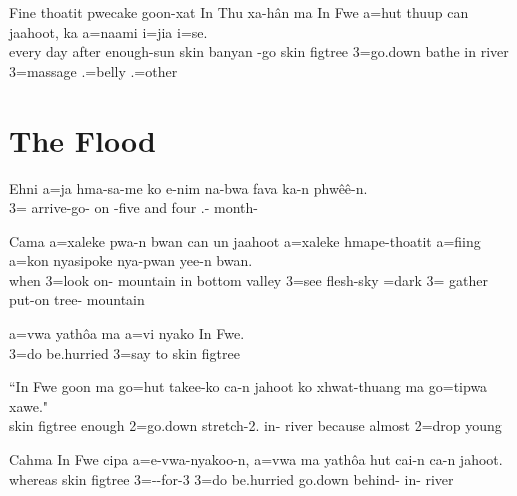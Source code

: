 \ea
\gll Fine thoatit pwecake goon-xat In Thu xa-hân ma In Fwe a=hut thuup can jaahoot, ka a=naami i=jia i=se.\\ 
every day after enough-sun skin banyan -go  skin figtree 3=go.down bathe in river  3=massage .=belly .=other\\ 
\glt {}
\z

\section{The Flood}

\ea
\gll Ehni a=ja hma-sa-me ko e-nim na-bwa fava ka-n phwêê-n.\\  3= arrive-go- on -five and four .- month-\\ \glt  {}
\z

\ea
\gll Cama a=xaleke pwa-n bwan can un jaahoot a=xaleke hmape-thoatit a=fiing a=kon nyasipoke nya-pwan yee-n bwan.\\ when 3=look on- mountain in bottom valley 3=see flesh-sky =dark 3= gather put-on tree- mountain
\\ \glt {}
\z

\ea
\gll a=vwa yathôa ma a=vi nyako In Fwe.\\ 3=do be.hurried  3=say to skin figtree\\ \glt {}
\z

\ea
\gll ``In Fwe goon ma go=hut takee-ko ca-n jahoot ko xhwat-thuang ma go=tipwa xawe."\\ skin figtree enough  2=go.down stretch-2. in- river because almost  2=drop young\\ \glt  {} 
\z 

\ea
\gll Cahma In Fwe cipa a=e-vwa-nyakoo-n, a=vwa ma yathôa hut cai-n ca-n jahoot.\\ 
     whereas skin figtree  3=--for-3 3=do  be.hurried go.down behind- in- river\\ 
\glt {}
\z 

